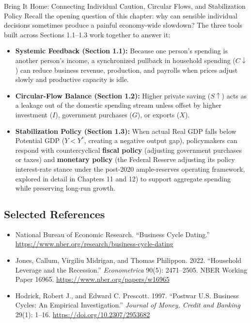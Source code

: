 \documentclass[11pt,letterpaper]{article}
\begin{document}
\begin{examplecase}{Bring It Home: Connecting Individual Caution, Circular Flows, and Stabilization Policy}
Recall the opening question of this chapter: why can sensible individual decisions sometimes produce a painful economy-wide slowdown? The three tools built across Sections 1.1--1.3 work together to answer it:
\begin{itemize}
    \item \textbf{Systemic Feedback (Section 1.1):} Because one person's spending is another person's income, a synchronized pullback in household spending ($C \downarrow$) can reduce business revenue, production, and payrolls when prices adjust slowly and productive capacity is idle.
    \item \textbf{Circular-Flow Balance (Section 1.2):} Higher private saving ($S \uparrow$) acts as a leakage out of the domestic spending stream unless offset by higher investment ($I$), government purchases ($G$), or exports ($X$).
    \item \textbf{Stabilization Policy (Section 1.3):} When actual Real GDP falls below Potential GDP ($Y < Y^*$, creating a negative output gap), policymakers can respond with countercyclical \textbf{fiscal policy} (adjusting government purchases or taxes) and \textbf{monetary policy} (the Federal Reserve adjusting its policy interest-rate stance under the post-2020 ample-reserves operating framework, explored in detail in Chapters 11 and 12) to support aggregate spending while preserving long-run growth.
\end{itemize}
\end{examplecase}

\subsection*{Selected References}
\begin{itemize}
    \item National Bureau of Economic Research. ``Business Cycle Dating.'' \url{https://www.nber.org/research/business-cycle-dating}
    \item Jones, Callum, Virgiliu Midrigan, and Thomas Philippon. 2022. ``Household Leverage and the Recession.'' \emph{Econometrica} 90(5): 2471--2505. NBER Working Paper 16965. \url{https://www.nber.org/papers/w16965}
    \item Hodrick, Robert J., and Edward C. Prescott. 1997. ``Postwar U.S. Business Cycles: An Empirical Investigation.'' \emph{Journal of Money, Credit and Banking} 29(1): 1--16. \url{https://doi.org/10.2307/2953682}
\end{itemize}
\end{document}
